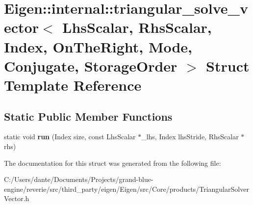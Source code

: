 \hypertarget{struct_eigen_1_1internal_1_1triangular__solve__vector_3_01_lhs_scalar_00_01_rhs_scalar_00_01_ind2257c92bae887c34b8b6b704148c0908}{}\section{Eigen\+::internal\+::triangular\+\_\+solve\+\_\+vector$<$ Lhs\+Scalar, Rhs\+Scalar, Index, On\+The\+Right, Mode, Conjugate, Storage\+Order $>$ Struct Template Reference}
\label{struct_eigen_1_1internal_1_1triangular__solve__vector_3_01_lhs_scalar_00_01_rhs_scalar_00_01_ind2257c92bae887c34b8b6b704148c0908}
\subsection*{Static Public Member Functions}
\begin{DoxyCompactItemize}
\item 
\mbox{\label{struct_eigen_1_1internal_1_1triangular__solve__vector_3_01_lhs_scalar_00_01_rhs_scalar_00_01_ind2257c92bae887c34b8b6b704148c0908_a677f09401393e22374f252697fea0a6b}} 
static void {\bfseries run} (Index size, const Lhs\+Scalar $\ast$\+\_\+lhs, Index lhs\+Stride, Rhs\+Scalar $\ast$rhs)
\end{DoxyCompactItemize}


The documentation for this struct was generated from the following file\+:\begin{DoxyCompactItemize}
\item 
C\+:/\+Users/dante/\+Documents/\+Projects/grand-\/blue-\/engine/reverie/src/third\+\_\+party/eigen/\+Eigen/src/\+Core/products/Triangular\+Solver\+Vector.\+h\end{DoxyCompactItemize}
